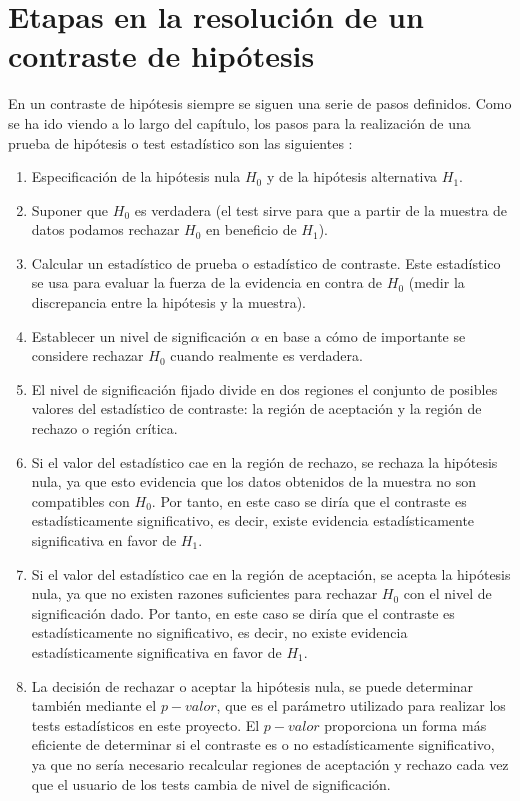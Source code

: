 \section{Etapas en la resolución de un contraste de hipótesis}
En un contraste de hipótesis siempre se siguen una serie de pasos definidos. Como se ha ido viendo a lo largo
del capítulo, los pasos para la realización de una prueba de hipótesis o test estadístico son las siguientes
\cite{libro}:
\begin{enumerate}
\item Especificación de la hipótesis nula $H_0$ y de la hipótesis alternativa $H_1$.
\item Suponer que $H_0$ es verdadera (el test sirve para que a partir de la muestra de datos podamos rechazar
$H_0$ en beneficio de $H_1$).
\item Calcular un estadístico de prueba o estadístico de contraste. Este estadístico se usa para evaluar la
fuerza de la evidencia en contra de $H_0$ (medir la discrepancia entre la hipótesis y la muestra).
\item Establecer un nivel de significación $\alpha$ en base a cómo de importante se considere rechazar $H_0$
cuando realmente es verdadera.
\item El nivel de significación fijado divide en dos regiones el conjunto de posibles valores del estadístico
de contraste: la región de aceptación y la región de rechazo o región crítica.
\item Si el valor del estadístico cae en la región de rechazo, se rechaza la hipótesis nula, ya que esto
evidencia que los datos obtenidos de la muestra no son compatibles con $H_0$. Por tanto, en este caso se diría
que el contraste es estadísticamente significativo, es decir, existe evidencia estadísticamente significativa en
favor de $H_1$.
\item Si el valor del estadístico cae en la región de aceptación, se acepta la hipótesis nula, ya que no existen
razones suficientes para rechazar $H_0$ con el nivel de significación dado. Por tanto, en este caso se diría
que el contraste es estadísticamente no significativo, es decir, no existe evidencia estadísticamente significativa
en favor de $H_1$.
\item La decisión de rechazar o aceptar la hipótesis nula, se puede determinar también mediante el $p-valor$,
que es el parámetro utilizado para realizar los tests estadísticos en este proyecto. El $p-valor$ proporciona
un forma más eficiente de determinar si el contraste es o no estadísticamente significativo, ya que no sería
necesario recalcular regiones de aceptación y rechazo cada vez que el usuario de los tests cambia de nivel de
significación.
\end{enumerate}

